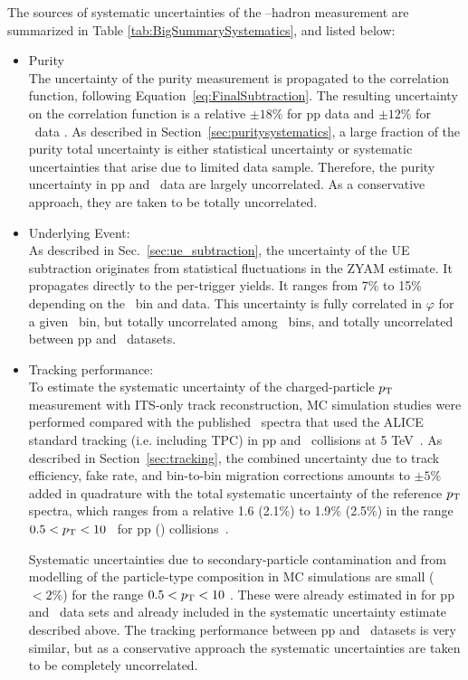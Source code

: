 The sources of systematic uncertainties of the \gammaiso--hadron measurement are summarized in Table \ref{tab:BigSummarySystematics}, and listed below:
\begin{itemize}
    \item Purity\\
The uncertainty of the purity measurement is propagated to the correlation function, following Equation~\ref{eq:FinalSubtraction}. The resulting uncertainty on the correlation function is a relative $\pm18\%$ for pp data and  $\pm12\%$ for \pPb~data . As described in Section~\ref{sec:puritysystematics}, a large fraction of the purity total uncertainty is either statistical uncertainty or systematic uncertainties that arise due to limited data sample. Therefore, the purity uncertainty in pp and \pPb~data are largely uncorrelated. As a conservative approach, they are taken to be totally uncorrelated.

\item	Underlying Event:\\
As described in Sec.~\ref{sec:ue_subtraction}, the uncertainty of the UE subtraction originates from statistical fluctuations in the ZYAM estimate. It propagates directly to the per-trigger yields. It ranges from 7\% to 15\% depending on the \zt~bin and data. This uncertainty is fully correlated in $\varphi$ for a given \zt~bin, but totally uncorrelated among \zt~bins, and totally uncorrelated between pp and \pPb~datasets.

\item Tracking performance:\\
To estimate the systematic uncertainty of the charged-particle $p_{\mathrm{T}}$ measurement with ITS-only track reconstruction, MC simulation studies were performed compared with the published \pt~spectra that used the ALICE standard tracking (i.e. including TPC) in pp and \pPb~collisions at 5 TeV~\cite{Acharya:2018qsh}. As described in Section~\ref{sec:tracking}, the combined uncertainty due to track efficiency, fake rate, and bin-to-bin migration corrections amounts to $\pm5\%$ added in quadrature with the total systematic uncertainty of the reference $p_{\mathrm{T}}$ spectra, which ranges from a relative 1.6 (2.1$\%$) to 1.9$\%$ (2.5$\%$) in the range $0.5<p_{\mathrm{T}}<10$ \GeVc~for pp (\pPb) collisions~\cite{Acharya:2018qsh}. 

Systematic uncertainties due to secondary-particle contamination and from modelling of the particle-type composition in MC simulations are small ($<2\%$) for the range $0.5<p_{\mathrm{T}}<10$ \GeVc. These were already estimated in \cite{Acharya:2018qsh} for pp and \pPb~data sets and already included in the systematic uncertainty estimate described above. The tracking performance between pp and \pPb~datasets is very similar, but as a conservative approach the systematic uncertainties are taken to be completely uncorrelated.



\end{itemize}
